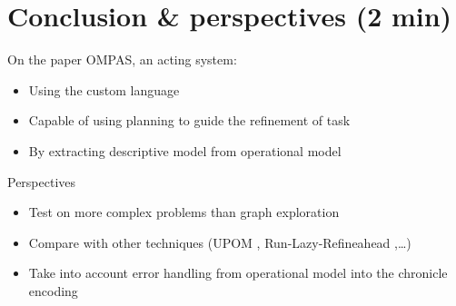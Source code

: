 \section{Conclusion \& perspectives (2 min)}
\begin{frame}[c]{On the paper}
    OMPAS, an acting system:
        \begin{itemize}
            \item Using the custom language
            \item Capable of using planning to guide the refinement of task
            \item By extracting descriptive model from operational model
        \end{itemize}

\end{frame}
\begin{frame}[c]{Perspectives}
    \begin{itemize}
        \item Test on more complex problems than graph exploration
        \pause
        \item Compare with other techniques (UPOM \cite{patraIntegratingActingPlanning2020}, Run-Lazy-Refineahead \cite{bansod2021integrating},\dots)
        \pause
        \item Take into account error handling from operational model into the chronicle encoding
    \end{itemize}
\end{frame}